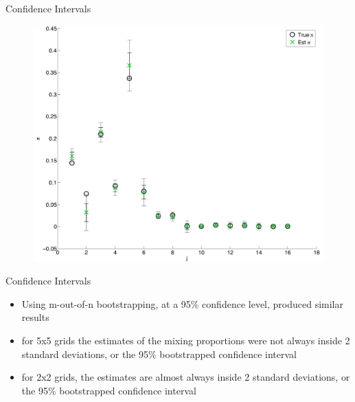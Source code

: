 \documentclass{beamer}
\begin{document}
\begin{frame}{Confidence Intervals}
	
	\begin{figure}
			\begin{center}
				\includegraphics[scale=0.3]{5x5eb.pdf}
			\end{center}
	\end{figure}
	
\end{frame}
\begin{frame}[shrink]{Confidence Intervals}
	
	\begin{itemize}
		\item Using m-out-of-n bootstrapping, at a 95\% confidence level, produced similar results
		\item for 5x5 grids the estimates of the mixing proportions were not always inside 2 standard deviations, or the 95\% bootstrapped confidence interval
		\item for 2x2 grids, the estimates are almost always inside 2 standard deviations, or the 95\% bootstrapped confidence interval
	\end{itemize}
	
\end{frame}
\end{document}
